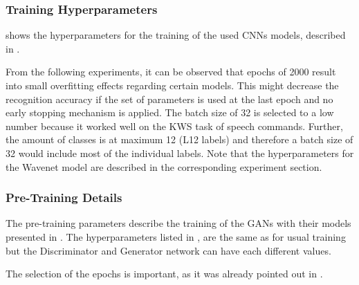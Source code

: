 
\subsubsection{Training Hyperparameters}
 shows the hyperparameters for the training of the used CNNs models, described in .

From the following experiments, it can be observed that epochs of 2000 result into small overfitting effects regarding certain models.
This might decrease the recognition accuracy if the set of parameters is used at the last epoch and no early stopping mechanism is applied.
The batch size of 32 is selected to a low number because it worked well on the KWS task of speech commands.
Further, the amount of classes is at maximum 12 (L12 labels) and therefore a batch size of 32 would include most of the individual labels.
Note that the hyperparameters for the Wavenet model are described in the corresponding experiment section.



\subsubsection{Pre-Training Details}
The pre-training parameters describe the training of the GANs with their models presented in .
The hyperparameters listed in , are the same as for usual training but the Discriminator and Generator network can have each different values.

The selection of the epochs is important, as it was already pointed out in .




